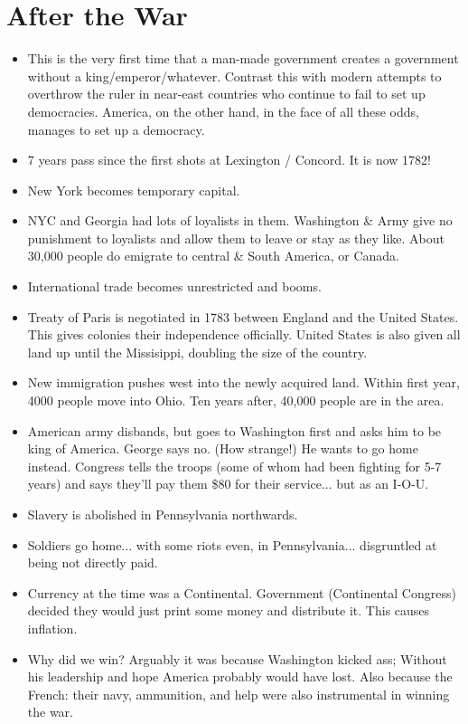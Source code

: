 \documentclass{article}
\begin{document}
  \section{After the War}
    \begin{itemize}
      \item This is the very first time that a man-made government creates a government without a king/emperor/whatever. Contrast this with modern attempts to overthrow the ruler in near-east countries who continue to fail to set up democracies. America, on the other hand, in the face of all these odds, manages to set up a democracy. 
      \item 7 years pass since the first shots at Lexington / Concord. It is now 1782!
      \item New York becomes temporary capital.
      \item NYC and Georgia had lots of loyalists in them. Washington \& Army give no punishment to loyalists and allow them to leave or stay as they like. About 30,000 people do emigrate to central \& South America, or Canada.
      \item International trade becomes unrestricted and booms.
      \item Treaty of Paris is negotiated in 1783 between England and the United States. This gives colonies their independence officially. United States is also given all land up until the Missisippi, doubling the size of the country.
      \item New immigration pushes west into the newly acquired land. Within first year, 4000 people move into Ohio. Ten years after, 40,000 people are in the area.
      \item American army disbands, but goes to Washington first and asks him to be king of America. George says no. (How strange!) He wants to go home instead. Congress tells the troops (some of whom had been fighting for 5-7 years) and says they'll pay them \$80 for their service... but as an I-O-U. 
      \item Slavery is abolished in Pennsylvania northwards. 
      \item Soldiers go home... with some riots even, in Pennsylvania... disgruntled at being not directly paid.
      \item Currency at the time was a Continental. Government  (Continental Congress) decided they would just print some money and distribute it. This causes inflation. 
      \item Why did we win? Arguably it was because Washington kicked ass; Without his leadership and hope America probably would have lost. Also because the French: their navy, ammunition, and help were also instrumental in winning the war. 
    \end{itemize}
\end{document}
